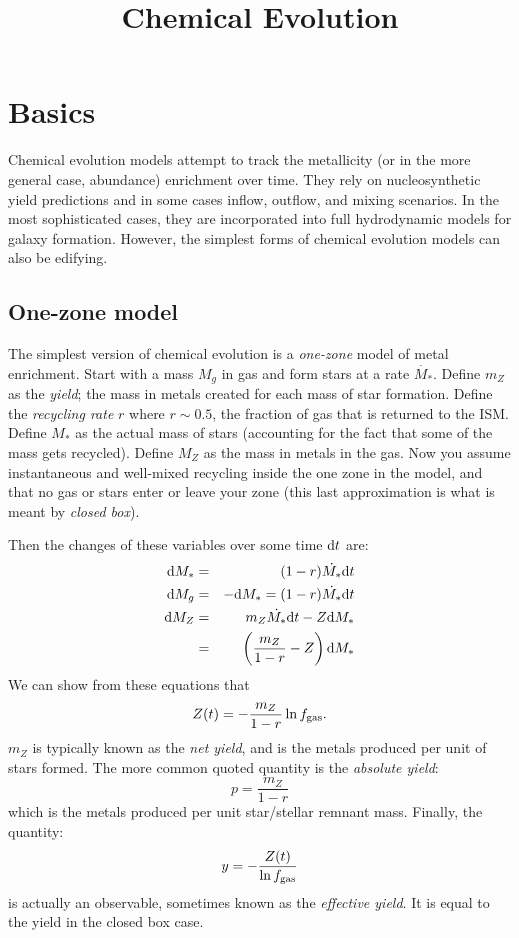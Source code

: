 \title{\bf Chemical Evolution}


\section{Basics}

Chemical evolution models attempt to track the metallicity (or in the
more general case, abundance) enrichment over time. They rely on
nucleosynthetic yield predictions and in some cases inflow, outflow,
and mixing scenarios. In the most sophisticated cases, they are
incorporated into full hydrodynamic models for galaxy
formation. However, the simplest forms of chemical evolution models
can also be edifying.

\subsection{One-zone model}

The simplest version of chemical evolution is a {\it one-zone} model
of metal enrichment. Start with a mass $M_g$ in gas and form stars at
a rate $\dot{M_\ast}$. Define $m_Z$ as the {\it yield}; the mass in
metals created for each mass of star formation. Define the {\it
recycling rate} $r$ where $r\sim 0.5$, the fraction of gas that is
returned to the ISM. Define $M_\ast$ as the actual mass of stars
(accounting for the fact that some of the mass gets recycled).  Define
$M_Z$ as the mass in metals in the gas.  Now you assume instantaneous
and well-mixed recycling inside the one zone in the model, and that no
gas or stars enter or leave your zone (this last approximation is what
is meant by {\it closed box}).

Then the changes of these variables over some time ${\rm d}t$ are:
\begin{eqnarray}
{\rm d}M_\ast &=& (1-r) \dot{M_\ast} {\rm d}t \cr
{\rm d}M_g &=& - {\rm d}M_\ast = (1-r) \dot{M_\ast} {\rm d}t \cr
{\rm d}M_Z &=& m_Z \dot{M_\ast} {\rm d}t - Z {\rm d}M_\ast \cr
&=& \left(\frac{m_Z}{1-r} - Z\right) {\rm d}M_\ast
\end{eqnarray}
We can show from these equations that
\begin{equation}
\label{eq:closedz}
Z(t) = - \frac{m_Z}{1-r} \ln f_{\rm gas}.
\end{equation}
$m_Z$ is typically known as the {\it net yield},
and is the metals produced per unit of stars formed. The more common
quoted quantity is the {\it absolute yield}:
\begin{equation}
p = \frac{m_Z}{1-r}
\end{equation}
which is the metals produced per unit star/stellar remnant mass.
Finally, the quantity:
\begin{equation}
y = -\frac{Z(t)}{\ln f_{\rm gas}}
\end{equation}
is actually an observable, sometimes known as the {\it effective
yield}. It is equal to the yield in the closed box case. 

